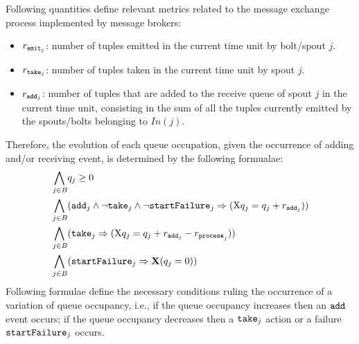 Following quantities define relevant metrics related to the message exchange process implemented by message brokers:
\begin{itemize}
\item $r_{\mathtt{emit}_{j}}$: number of tuples emitted in the current time unit by bolt/spout $j$.
\item $r_{\mathtt{take}_{j}}$: number of tuples taken in the current time unit by spout $j$.
\item $r_{\mathtt{add}_{j}}$: number of tuples that are added to the receive queue of spout $j$ in the current time unit, consisting in the sum of all the tuples currently emitted by the spouts/bolts belonging to $In(j)$.
\end{itemize}
%
Therefore, the evolution of each queue occupation, given the occurrence of adding and/or receiving event, is determined by the following formualae:
%
\begin{align*}
\bigwedge_{
\begin{subarray}{c}
\,j \in B
\end{subarray}
} & q_j \geq  0\\ %
%
 \bigwedge_{
\begin{subarray}{c}
\,j \in B
\end{subarray}
} &( \add{j}  \wedge \lnot \ta{j}  \land \lnot \startf{j}
\Rightarrow (\aX q_j = q_j + \ra{j} ))\\ %
%
%
 \bigwedge_{
\begin{subarray}{c}
\,j \in B
\end{subarray}
} &( \ta{j}{}  \Rightarrow (\aX q_j = q_j + \ra{j} - \rp{j} )) \\%
%
%
%
%
%
%
 \bigwedge_{
\begin{subarray}{c}
\,j \in B
\end{subarray}
} &( \startf{j}
\Rightarrow \mathbf{X}( q_j = 0 ))
\end{align*}
%
Following formulae define the necessary conditions ruling the occurrence of a variation of queue occupancy, i.e., if the queue occupancy increases then an $\mathtt{add}_{}$ event occurs; if the queue occupancy decreases then a $\mathtt{take}_{j}$ action or a failure  $\mathtt{startFailure}_{j}$ occurs.
